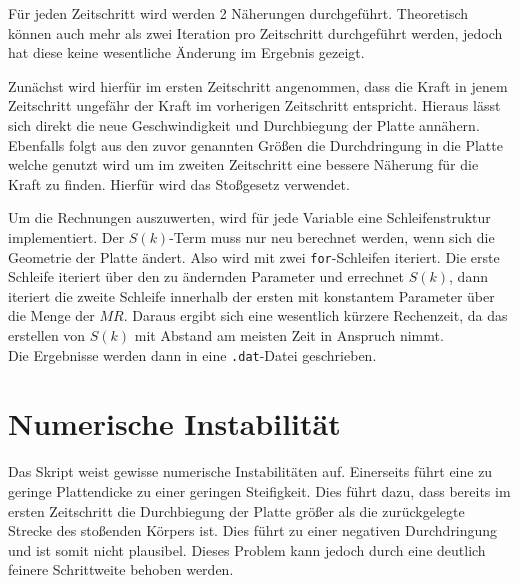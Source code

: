 Für jeden Zeitschritt wird werden 2 Näherungen durchgeführt. Theoretisch können auch mehr als zwei Iteration pro Zeitschritt durchgeführt werden, jedoch hat diese keine wesentliche Änderung im Ergebnis gezeigt.

Zunächst wird hierfür im ersten Zeitschritt angenommen, dass die Kraft in jenem Zeitschritt ungefähr der Kraft im vorherigen Zeitschritt entspricht. Hieraus lässt sich direkt die neue Geschwindigkeit und Durchbiegung der Platte annähern. Ebenfalls folgt aus den zuvor genannten Größen die Durchdringung in die Platte welche genutzt wird um im zweiten Zeitschritt eine bessere Näherung für die Kraft zu finden. Hierfür wird das Stoßgesetz verwendet.

Um die Rechnungen auszuwerten, wird für jede Variable eine Schleifenstruktur implementiert. Der $S(k)$-Term muss nur neu berechnet werden, wenn sich die Geometrie der Platte ändert. Also wird mit zwei \texttt{for}-Schleifen iteriert. Die erste Schleife iteriert über den zu ändernden Parameter und errechnet $S(k)$, dann iteriert die zweite Schleife innerhalb der ersten mit konstantem Parameter über die Menge der $MR$.  Daraus ergibt sich eine wesentlich kürzere Rechenzeit, da das erstellen von $S(k)$ mit Abstand am meisten Zeit in Anspruch nimmt. \\
Die Ergebnisse werden dann in eine \texttt{.dat}-Datei geschrieben. 


\section*{Numerische Instabilität}

Das Skript weist gewisse numerische Instabilitäten auf. Einerseits führt eine zu geringe Plattendicke zu einer geringen Steifigkeit. Dies führt dazu, dass bereits im ersten Zeitschritt die Durchbiegung der Platte größer als die zurückgelegte Strecke des stoßenden Körpers ist. Dies führt zu einer negativen Durchdringung und ist somit nicht plausibel. Dieses Problem kann jedoch durch eine deutlich feinere Schrittweite behoben werden.







